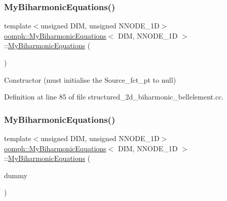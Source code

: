 \subsubsection{\texorpdfstring{My\+Biharmonic\+Equations()}{MyBiharmonicEquations()}\hspace{0.1cm}{\footnotesize\ttfamily [1/2]}}
{\footnotesize\ttfamily template$<$unsigned D\+IM, unsigned N\+N\+O\+D\+E\+\_\+1D$>$ \\
\hyperlink{classoomph_1_1MyBiharmonicEquations}{oomph\+::\+My\+Biharmonic\+Equations}$<$ D\+IM, N\+N\+O\+D\+E\+\_\+1D $>$\+::\hyperlink{classoomph_1_1MyBiharmonicEquations}{My\+Biharmonic\+Equations} (\begin{DoxyParamCaption}{ }\end{DoxyParamCaption})\hspace{0.3cm}{\ttfamily [inline]}}



Constructor (must initialise the Source\+\_\+fct\+\_\+pt to null) 



Definition at line 85 of file structured\+\_\+2d\+\_\+biharmonic\+\_\+bellelement.\+cc.

\mbox{\label{classoomph_1_1MyBiharmonicEquations_a3cf0e0a63e46219b94195aa4ab926316}} 
\subsubsection{\texorpdfstring{My\+Biharmonic\+Equations()}{MyBiharmonicEquations()}\hspace{0.1cm}{\footnotesize\ttfamily [2/2]}}
{\footnotesize\ttfamily template$<$unsigned D\+IM, unsigned N\+N\+O\+D\+E\+\_\+1D$>$ \\
\hyperlink{classoomph_1_1MyBiharmonicEquations}{oomph\+::\+My\+Biharmonic\+Equations}$<$ D\+IM, N\+N\+O\+D\+E\+\_\+1D $>$\+::\hyperlink{classoomph_1_1MyBiharmonicEquations}{My\+Biharmonic\+Equations} (\begin{DoxyParamCaption}\item[{const \hyperlink{classoomph_1_1MyBiharmonicEquations}{My\+Biharmonic\+Equations}$<$ D\+IM, N\+N\+O\+D\+E\+\_\+1D $>$ \&}]{dummy }\end{DoxyParamCaption})\hspace{0.3cm}{\ttfamily [inline]}}



